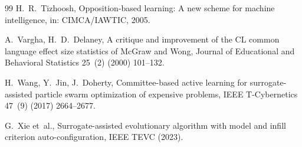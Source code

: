 \documentclass[preprint,12pt,authoryear]{elsarticle}
\begin{document}
\begin{thebibliography}{99}
H.~R.~Tizhoosh, Opposition-based learning: A new scheme for machine intelligence, in: CIMCA/IAWTIC, 2005.

A.~Vargha, H.~D.~Delaney, A critique and improvement of the CL common language effect size statistics of McGraw and Wong, Journal of Educational and Behavioral Statistics 25~(2) (2000) 101--132.

H.~Wang, Y.~Jin, J.~Doherty, Committee-based active learning for surrogate-assisted particle swarm optimization of expensive problems, IEEE T-Cybernetics 47~(9) (2017) 2664--2677.

G.~Xie et~al., Surrogate-assisted evolutionary algorithm with model and infill criterion auto-configuration, IEEE TEVC (2023).

\end{thebibliography}
\endgroup
\end{document}
